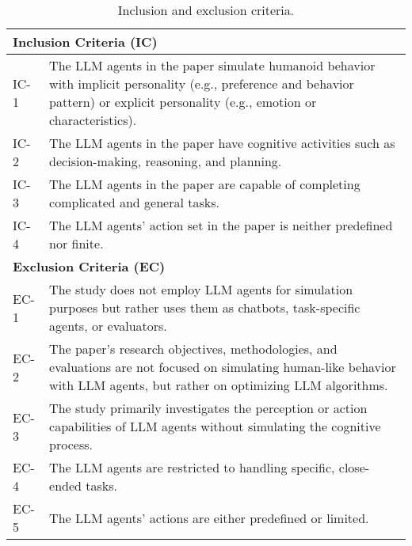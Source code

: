 \begin{table}[t]
\small
\caption{Inclusion and exclusion criteria.}
\label{tab:criteria}
\begin{tabularx}{\columnwidth}{lX}
    \toprule
    \multicolumn{2}{l}{\textbf{Inclusion Criteria (IC)}} \\
    \midrule
        IC-1 & The LLM agents in the paper simulate humanoid behavior with implicit personality (e.g., preference and behavior pattern) or explicit personality (e.g., emotion or characteristics).  \\
        IC-2 & The LLM agents in the paper have cognitive activities such as decision-making, reasoning, and planning. \\
        IC-3 & The LLM agents in the paper are capable of completing complicated and general tasks. \\
        IC-4 & The LLM agents' action set in the paper is neither predefined nor finite. \\
    \midrule
    \multicolumn{2}{l}{\textbf{Exclusion Criteria (EC)}} \\
    \midrule
        EC-1 & The study does not employ LLM agents for simulation purposes but rather uses them as chatbots, task-specific agents, or evaluators. \\
        EC-2 & The paper's research objectives, methodologies, and evaluations are not focused on simulating human-like behavior with LLM agents, but rather on optimizing LLM algorithms. \\
        EC-3 & The study primarily investigates the perception or action capabilities of LLM agents without simulating the cognitive process. \\
        EC-4 & The LLM agents are restricted to handling specific, close-ended tasks. \\
        EC-5 & The LLM agents' actions are either predefined or limited. \\
    \bottomrule
\end{tabularx}
\end{table}